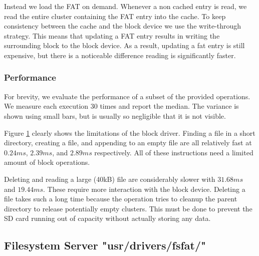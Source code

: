 Instead we load the FAT on demand.
Whenever a non cached entry is read, we read the entire cluster containing the FAT entry into the cache.
To keep consistency between the cache and the block device we use the write-through strategy.
This means that updating a FAT entry results in writing the surrounding block to the block device.
As a result, updating a fat entry is still expensive, but there is a noticeable difference reading is significantly faster.

\subsubsection{Performance}

For brevity, we evaluate the performance of a subset of the provided operations.
We measure each execution 30 times and report the median.
The variance is shown using small bars, but is usually so negligible that it is
not visible.

\begin{figure}[ht]
    \centering
         \subfloat[\centering ]{{\scalebox{0.4}{ }}}
         \subfloat[\centering ]{{\scalebox{0.4}{ }}}
    \caption{}
    \label{fig:fs_fat32_lib_ops}
    
\end{figure}

Figure \ref{fig:fs_fat32_lib_ops} clearly shows the limitations of the block
driver.
Finding a file in a short directory, creating a file, and appending to an empty
file are all relatively fast at $0.24ms$, $2.39ms$, and $2.89ms$ respectively.
All of these instructions need a limited amount of block operations.

Deleting and reading a large (40kB) file are considerably slower with $31.68ms$
and $19.44ms$.
These require more interaction with the block device.
Deleting a file takes such a long time because the operation tries to cleanup
the parent directory to release potentially empty clusters.
This must be done to prevent the SD card running out of capacity without
actually storing any data. 


\subsection{Filesystem Server "usr/drivers/fsfat/"}

